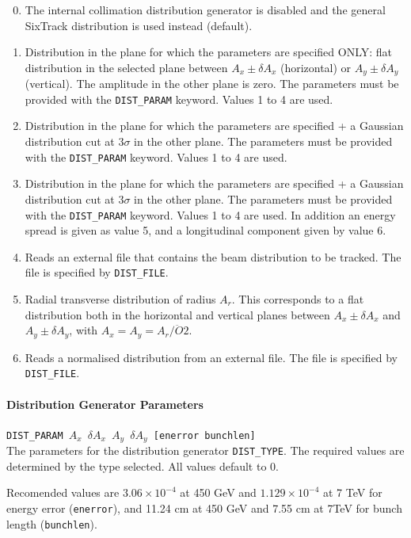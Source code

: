 \begin{enumerate}
    \setcounter{enumi}{-1}
    \item The internal collimation distribution generator is disabled and the general SixTrack distribution is used instead (default).
    \item Distribution in the plane for which the parameters are specified ONLY: flat distribution in the selected plane between $A_x \pm \delta A_x$ (horizontal) or $A_y \pm \delta A_y$ (vertical). The amplitude in the other plane is zero. The parameters must be provided with the \texttt{DIST\_PARAM} keyword. Values 1 to 4 are used.
    \item Distribution in the plane for which the parameters are specified + a Gaussian distribution cut at $3\sigma$ in the other plane. The parameters must be provided with the \texttt{DIST\_PARAM} keyword. Values 1 to 4 are used.
    \item Distribution in the plane for which the parameters are specified + a Gaussian distribution cut at $3\sigma$ in the other plane. The parameters must be provided with the \texttt{DIST\_PARAM} keyword. Values 1 to 4 are used. In addition an energy spread is given as value 5, and a longitudinal component given by value 6.
    \item Reads an external file that contains the beam distribution to be tracked. The file is specified by \texttt{DIST\_FILE}.
    \item Radial transverse distribution of radius $A_r$. This corresponds to a flat distribution both in the horizontal and vertical planes between $A_x \pm \delta A_x$ and $A_y \pm \delta A_y$, with $A_x = A_y = A_r/\ddot{O}2$.
    \item Reads a normalised distribution from an external file. The file is specified by \texttt{DIST\_FILE}.
\end{enumerate}

\paragraph{Distribution Generator Parameters} \texttt{DIST\_PARAM $A_x$ $\delta A_x$ $A_y$ $\delta A_y$ [enerror bunchlen]}\\

The parameters for the distribution generator \texttt{DIST\_TYPE}.
The required values are determined by the type selected.
All values default to 0.

Recomended values are $3.06 \times 10^{-4}$ at 450 GeV and $1.129 \times 10^{-4}$ at 7 TeV for energy error (\texttt{enerror}), and 11.24 cm at 450 GeV and 7.55 cm at 7TeV for bunch length (\texttt{bunchlen}).

